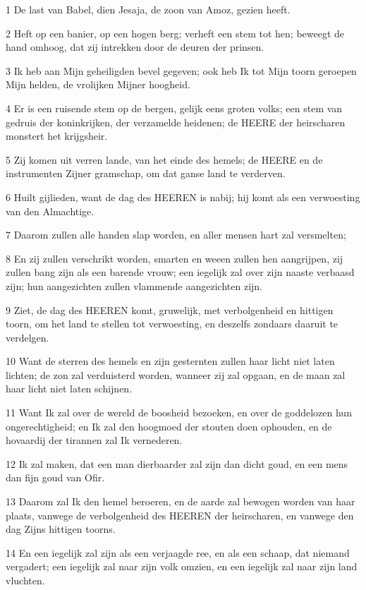 \par 1 De last van Babel, dien Jesaja, de zoon van Amoz, gezien heeft.
\par 2 Heft op een banier, op een hogen berg; verheft een stem tot hen; beweegt de hand omhoog, dat zij intrekken door de deuren der prinsen.
\par 3 Ik heb aan Mijn geheiligden bevel gegeven; ook heb Ik tot Mijn toorn geroepen Mijn helden, de vrolijken Mijner hoogheid.
\par 4 Er is een ruisende stem op de bergen, gelijk eens groten volks; een stem van gedruis der koninkrijken, der verzamelde heidenen; de HEERE der heirscharen monstert het krijgsheir.
\par 5 Zij komen uit verren lande, van het einde des hemels; de HEERE en de instrumenten Zijner gramschap, om dat ganse land te verderven.
\par 6 Huilt gijlieden, want de dag des HEEREN is nabij; hij komt als een verwoesting van den Almachtige.
\par 7 Daarom zullen alle handen slap worden, en aller mensen hart zal versmelten;
\par 8 En zij zullen verschrikt worden, smarten en weeen zullen hen aangrijpen, zij zullen bang zijn als een barende vrouw; een iegelijk zal over zijn naaste verbaasd zijn; hun aangezichten zullen vlammende aangezichten zijn.
\par 9 Ziet, de dag des HEEREN komt, gruwelijk, met verbolgenheid en hittigen toorn, om het land te stellen tot verwoesting, en deszelfs zondaars daaruit te verdelgen.
\par 10 Want de sterren des hemels en zijn gesternten zullen haar licht niet laten lichten; de zon zal verduisterd worden, wanneer zij zal opgaan, en de maan zal haar licht niet laten schijnen.
\par 11 Want Ik zal over de wereld de boosheid bezoeken, en over de goddelozen hun ongerechtigheid; en Ik zal den hoogmoed der stouten doen ophouden, en de hovaardij der tirannen zal Ik vernederen.
\par 12 Ik zal maken, dat een man dierbaarder zal zijn dan dicht goud, en een mens dan fijn goud van Ofir.
\par 13 Daarom zal Ik den hemel beroeren, en de aarde zal bewogen worden van haar plaats, vanwege de verbolgenheid des HEEREN der heirscharen, en vanwege den dag Zijns hittigen toorns.
\par 14 En een iegelijk zal zijn als een verjaagde ree, en als een schaap, dat niemand vergadert; een iegelijk zal naar zijn volk omzien, en een iegelijk zal naar zijn land vluchten.
